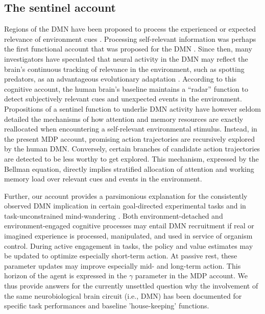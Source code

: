 \documentclass[10pt,letterpaper]{article}
\begin{document}
\subsection{The sentinel account}
Regions of the DMN have been proposed to process the
experienced or expected relevance of environment cues
\citep{montague2006imaging}.
Processing self-relevant information was perhaps the first
functional account that was proposed for the DMN
\citep{gusnard2001medial, raichle2001pnas}.
Since then,
many investigators have speculated that neural activity in the DMN
may reflect the brain's continuous tracking of
relevance in the environment, such as spotting predators,
as an advantageous evolutionary adaptation \citep{randy2008, hahn2007cingulate}.
According to this cognitive account, the human brain's baseline maintains
a ``radar'' function to
detect subjectively relevant cues and unexpected events in the environment.
Propositions of a sentinel function to underlie DMN activity
have however seldom detailed
the mechanisms of
how attention and memory resources are exactly reallocated when
encountering a self-relevant environmental stimulus.
Instead,
in the present MDP account,
promising action trajectories
are recursively explored by the human DMN. Conversely,
certain branches of candidate action trajectories
are detected to be less worthy to get explored.
This mechanism, expressed by the Bellman equation,
directly implies stratified allocation of attention and working memory load
over relevant cues and events in the environment.




Further,
our account provides a parsimonious explanation for
the consistently observed DMN implication
in certain goal-directed experimental tasks and
in task-unconstrained mind-wandering \citep{smith2009, bzdok2016formal}.
Both environment-detached and environment-engaged
cognitive processes may entail DMN recruitment
if real or imagined experience is processed, manipulated, and
used in service of organism control.
During active engagement in tasks,
the policy and value estimates may be
updated to optimize especially short-term action.
At passive rest, these parameter updates may
improve especially mid- and long-term action.
This horizon of the agent
is expressed in the $\gamma$ parameter in the MDP account.
We thus provide answers for the currently unsettled question why the involvement
of the same neurobiological brain circuit (i.e., DMN) has been documented
for specific task performances and baseline 'house-keeping' functions.
\end{document}
